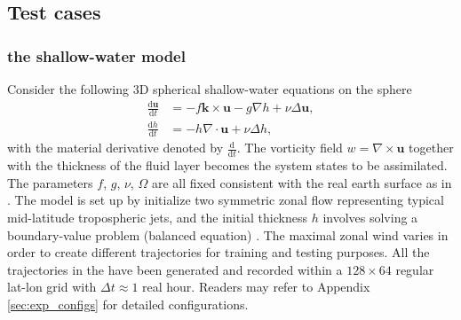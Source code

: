 \documentclass{article}
\newcommand{\md}{\mathrm{d}}
\begin{document}
\subsection{Test cases}\label{sec:test-eqs}
\subsubsection{the shallow-water model}
Consider the following 3D spherical shallow-water equations on the sphere
\begin{align*}
	\frac{\md\bm u}{\md t} & =-f\bm k\times\bm u-g\nabla h+\nu\Delta\bm u, \\
	\frac{\md h}{\md t}    & =-h\nabla\cdot\bm u+\nu\Delta h,
\end{align*}
with the material derivative denoted by $\frac{\md}{\md t}$. The vorticity field $w=\nabla\times\bm u$ together with the thickness of the fluid layer becomes the system states to be assimilated. The parameters $f$, $g$, $\nu$, $\Omega$ are all fixed consistent with the real earth surface as in \cite{Galewsky-2004}. The model is set up by initialize two symmetric zonal flow representing typical mid-latitude tropospheric jets, and the initial thickness $h$ involves solving a boundary-value problem (balanced equation) \cite{Galewsky-2004}. The maximal zonal wind varies in order to create different trajectories for training and testing purposes. All the trajectories in the have been generated and recorded within a $128\times64$ regular lat-lon grid with $\Delta t\approx1$ real hour. Readers may refer to Appendix \ref{sec:exp_configs} for detailed configurations.
\end{document}
